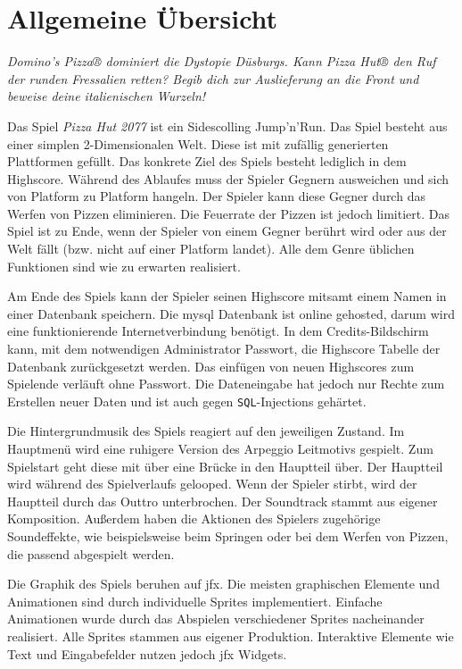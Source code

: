 \section{Allgemeine Übersicht}

\textit{
Domino's Pizza® dominiert die Dystopie Düsburgs.
Kann Pizza Hut® den Ruf der runden Fressalien retten?
Begib dich zur Auslieferung an die Front und beweise deine italienischen Wurzeln!
}

Das Spiel \textit{Pizza Hut 2077} ist ein Sidescolling Jump'n'Run.
Das Spiel besteht aus einer simplen 2-Dimensionalen Welt.
Diese ist mit zufällig generierten Plattformen gefüllt.
Das konkrete Ziel des Spiels besteht lediglich in dem Highscore.
Während des Ablaufes muss der Spieler Gegnern ausweichen und sich von Platform zu Platform hangeln.
Der Spieler kann diese Gegner durch das Werfen von Pizzen eliminieren.
Die Feuerrate der Pizzen ist jedoch limitiert.
Das Spiel ist zu Ende, wenn der Spieler von einem Gegner berührt wird oder aus der Welt fällt (bzw. nicht auf einer Platform landet).
Alle dem Genre üblichen Funktionen sind wie zu erwarten realisiert.

Am Ende des Spiels kann der Spieler seinen Highscore mitsamt einem Namen in einer Datenbank speichern.
Die \gls{mysql} Datenbank ist online gehosted, darum wird eine funktionierende Internetverbindung benötigt.
In dem Credits-Bildschirm kann, mit dem notwendigen Administrator Passwort, die Highscore Tabelle der Datenbank zurückgesetzt werden.
Das einfügen von neuen Highscores zum Spielende verläuft ohne Passwort.
Die Dateneingabe hat jedoch nur Rechte zum Erstellen neuer Daten und ist auch gegen \texttt{SQL}-Injections gehärtet.

Die Hintergrundmusik des Spiels reagiert auf den jeweiligen Zustand.
Im Hauptmenü wird eine ruhigere Version des Arpeggio Leitmotivs gespielt.
Zum Spielstart geht diese mit über eine Brücke in den Hauptteil über.
Der Hauptteil wird während des Spielverlaufs gelooped.
Wenn der Spieler stirbt, wird der Hauptteil durch das Outtro unterbrochen.
Der Soundtrack stammt aus eigener Komposition.
Außerdem haben die Aktionen des Spielers zugehörige Soundeffekte, wie beispielsweise beim Springen oder bei dem Werfen von Pizzen, die passend abgespielt werden.

Die Graphik des Spiels beruhen auf \gls{jfx}.
Die meisten graphischen Elemente und Animationen sind durch individuelle Sprites implementiert.
Einfache Animationen wurde durch das Abspielen verschiedener Sprites nacheinander realisiert.
Alle Sprites stammen aus eigener Produktion.
Interaktive Elemente wie Text und Eingabefelder nutzen jedoch \gls{jfx} Widgets.

